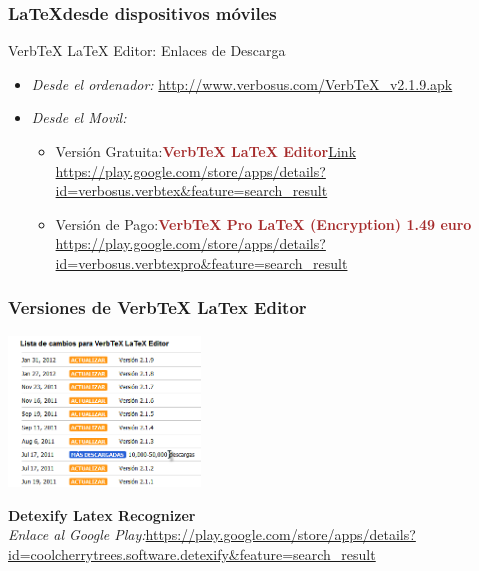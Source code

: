 \documentclass[sans serif,9pt,xcolor=dvipsnames]{beamer}%
\begin{document}
\begin{frame}
\frametitle{\LaTeX desde dispositivos móviles}


\begin{block}{ VerbTeX LaTeX Editor: Enlaces de Descarga}
\begin{itemize}
\justifying
\item \textit{Desde el ordenador:}  \textcolor{blue}{\url{http://www.verbosus.com/VerbTeX_v2.1.9.apk}}
\item \textit{Desde el Movil:} 
\begin{itemize}
\justifying
\item Versión Gratuita:\textcolor{brown}{\textbf{VerbTeX LaTeX Editor}}\hfill \textcolor{blue}{\url{Link https://play.google.com/store/apps/details?id=verbosus.verbtex&feature=search_result }}
\item Versión de Pago:\textcolor{brown}{\textbf{VerbTeX Pro LaTeX (Encryption) 1.49 euro }}  \hfill \textcolor{blue}{\url{https://play.google.com/store/apps/details?id=verbosus.verbtexpro&feature=search_result }}
\end{itemize}
\end{itemize}
\end{block}

\end{frame}

\begin{frame}
\frametitle {Versiones de VerbTeX LaTex Editor}
\begin{center}
\includegraphics[height=4cm]{imagenes/vMobil.png} 
\end{center}
\justifying
\textbf{Detexify Latex Recognizer}\\
\textit{Enlace al Google Play:}\textcolor{blue}{\url{https://play.google.com/store/apps/details?id=coolcherrytrees.software.detexify&feature=search_result }}
\end{frame}
\end{document}
